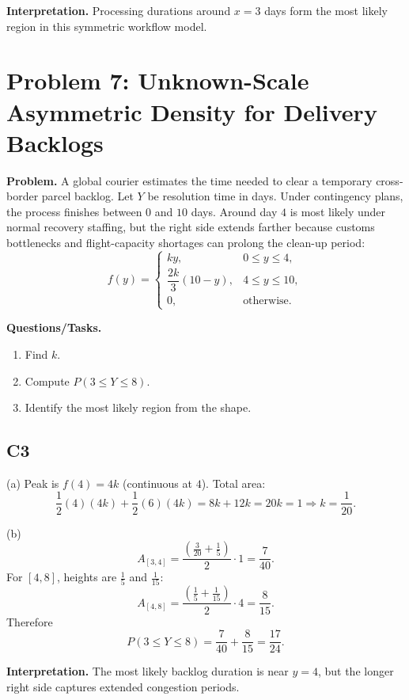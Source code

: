 \textbf{Interpretation.}
Processing durations around $x=3$ days form the most likely region in this symmetric workflow model.

\section{Problem 7: Unknown-Scale Asymmetric Density for Delivery Backlogs}

\textbf{Problem.}
A global courier estimates the time needed to clear a temporary cross-border parcel backlog. Let $Y$ be resolution time in days. Under contingency plans, the process finishes between $0$ and $10$ days. Around day $4$ is most likely under normal recovery staffing, but the right side extends farther because customs bottlenecks and flight-capacity shortages can prolong the clean-up period:
\[
f(y)=\begin{cases}
ky, & 0\le y\le 4,\\
\dfrac{2k}{3}(10-y), & 4\le y\le 10,\\
0, & \text{otherwise.}
\end{cases}
\]

\textbf{Questions/Tasks.}
\begin{enumerate}[label=(\alph*)]
\item Find $k$.
\item Compute $P(3\le Y\le 8)$.
\item Identify the most likely region from the shape.
\end{enumerate}

\subsection*{C3}
(a) Peak is $f(4)=4k$ (continuous at $4$).
Total area:
\[
\frac12(4)(4k)+\frac12(6)(4k)=8k+12k=20k=1\Rightarrow k=\frac1{20}.
\]

(b)
\[
A_{[3,4]}=\frac{\left(\frac3{20}+\frac15\right)}{2}\cdot1=\frac7{40}.
\]
For $[4,8]$, heights are $\frac15$ and $\frac1{15}$:
\[
A_{[4,8]}=\frac{\left(\frac15+\frac1{15}\right)}{2}\cdot4=\frac{8}{15}.
\]
Therefore
\[
P(3\le Y\le 8)=\frac7{40}+\frac{8}{15}=\frac{17}{24}.
\]

\textbf{Interpretation.}
The most likely backlog duration is near $y=4$, but the longer right side captures extended congestion periods.

